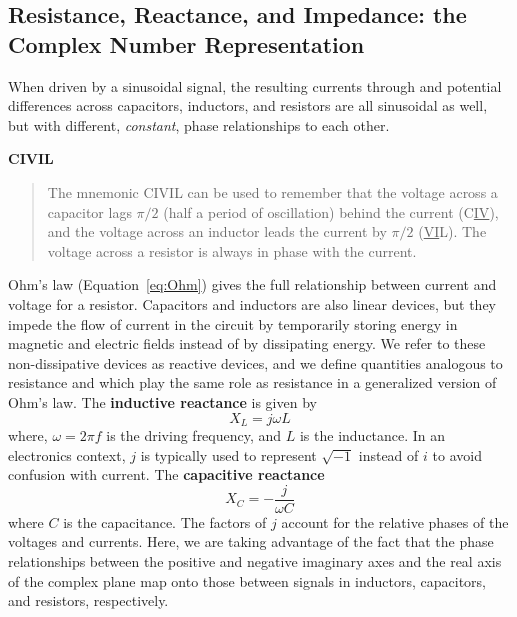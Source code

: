 \documentclass[11pt]{article}
\begin{document}
\subsection{Resistance, Reactance, and Impedance: the Complex Number 
  Representation}

When driven by a sinusoidal signal, the resulting currents through and
potential differences across capacitors, inductors, and resistors are
all sinusoidal as well, but with different, \textit{constant}, phase
relationships to each other.

\begin{latexonly}
  \noindent
  \hrulefill
\end{latexonly}

\htmlrule
\noindent
\textbf{CIVIL}
\begin{quote}
The mnemonic CIVIL can be used to
remember that the voltage across a capacitor lags $\pi/2$ (half a
period of oscillation) behind the current (C\underline{IV}), and the
voltage across an inductor leads the current by $\pi/2$
(\underline{VI}L). The voltage across a resistor is always in phase
with the current.
\end{quote}
\htmlrule

\begin{latexonly}
  \noindent
  \hrulefill
\end{latexonly}

Ohm's law (Equation~\ref{eq:Ohm}) gives the full relationship between
current and voltage for a resistor. Capacitors and inductors are also
linear devices, but they impede the flow of current in the circuit
by temporarily storing energy in magnetic and electric fields instead
of by dissipating energy. We refer to these non-dissipative devices as
reactive devices, and we define quantities analogous to resistance
and which play the same role as resistance in a generalized version of
Ohm's law. The \textbf{inductive reactance} is given by
\begin{equation}
  X_L = j \omega L
  \label{eq:xl}
\end{equation}
where, $\omega = 2 \pi f$ is the driving frequency, and $L$ is the
inductance. In an electronics context,  $j$ is typically used to
represent $\sqrt{-1}$ instead of $i$ to avoid confusion with
current. The \textbf{capacitive reactance} 
\begin{equation}
  X_C = -\frac{j}{\omega C}
  \label{eq:xc}
\end{equation}
where $C$ is the capacitance. The factors of $j$ account for the
relative phases of the voltages and currents. Here, we are taking
advantage of the fact that the phase relationships between the
positive and negative imaginary axes and the real axis of the complex
plane map onto those between signals in inductors, capacitors, and
resistors, respectively.
\end{document}
